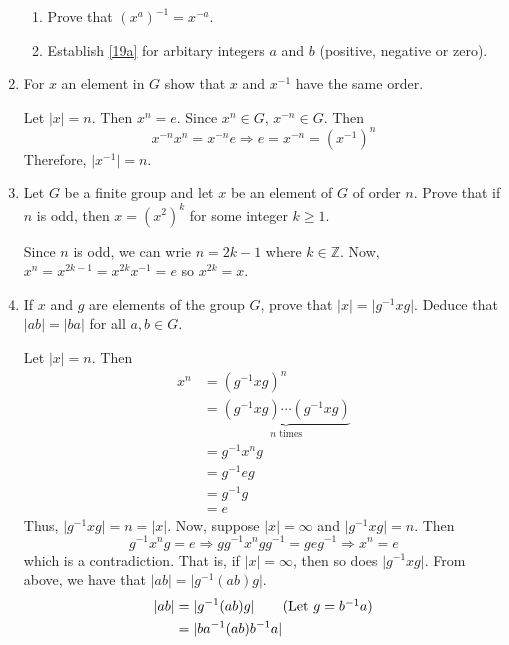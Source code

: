\begin{enumerate}
\begin{enumerate}[label = (\alph*), ref = \theenumi (\alph*)]
  \item
    Prove that \((x^a)^{-1} = x^{-a}\).
  \item
    Establish \cref{19a} for arbitary integers \(a\) and \(b\) (positive,
    negative or zero).
  \end{enumerate}
\item
  For \(x\) an element in \(G\) show that \(x\) and \(x^{-1}\) have the same
  order.
  \par\smallskip
  Let \(\lvert x\rvert = n\).
  Then \(x^n = e\).
  Since \(x^n\in G\), \(x^{-n}\in G\).
  Then
  \[
  x^{-n}x^n = x^{-n}e\Rightarrow e = x^{-n} = (x^{-1})^n
  \]
  Therefore, \(\lvert x^{-1}\rvert = n\).
\item
  Let \(G\) be a finite group and let \(x\) be an element of \(G\) of order
  \(n\).
  Prove that if \(n\) is odd, then \(x = (x^2)^k\) for some integer
  \(k\geq 1\).
  \par\smallskip
  Since \(n\) is odd, we can wrie \(n = 2k - 1\) where \(k\in\mathbb{Z}\).
  Now, \(x^n = x^{2k - 1} = x^{2k}x^{-1} = e\) so \(x^{2k} = x\).
\item
  If \(x\) and \(g\) are elements of the group \(G\), prove that
  \(\lvert x\rvert = \lvert g^{-1}xg\rvert\).
  Deduce that \(\lvert ab\rvert = \lvert ba\rvert\) for all \(a,b\in G\).
  \par\smallskip
  Let \(\lvert x\rvert = n\).
  Then
  \begin{align*}
    x^n & = (g^{-1}xg)^n\\
        & = \underbrace{(g^{-1}xg)\cdots (g^{-1}xg)}_{n\text{ times}}\\
        & = g^{-1}x^ng\\
        & = g^{-1}eg\\
        & = g^{-1}g\\
        & = e
  \end{align*}
  Thus, \(\lvert g^{-1}xg\rvert = n = \lvert x\rvert\).
  Now, suppose \(\lvert x\rvert = \infty\) and \(\lvert g^{-1}xg\rvert = n\).
  Then
  \[
  g^{-1}x^ng = e\Rightarrow gg^{-1}x^ngg^{-1} = geg^{-1}\Rightarrow
  x^n = e
  \]
  which is a contradiction.
  That is, if \(\lvert x\rvert = \infty\), then so does
  \(\lvert g^{-1}xg\rvert\).
  From above, we have that \(\lvert ab\rvert = \lvert g^{-1}(ab)g\rvert\).
  \begin{align*}
    \lvert ab\rvert & = \lvert g^{-1}(ab)g\rvert\tag{Let \(g = b^{-1}a\)}\\
                    & = \lvert ba^{-1}(ab)b^{-1}a\rvert\\

\end{align*}
\end{enumerate}
